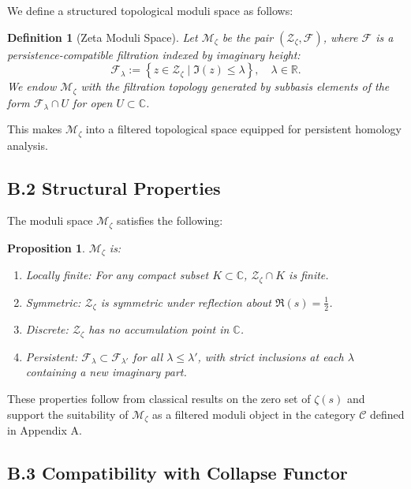 \documentclass[11pt]{article}
\newtheorem{definition}[theorem]{Definition}
\newtheorem{proposition}[theorem]{Proposition}
\begin{document}
We define a structured topological moduli space as follows:

\begin{definition}[Zeta Moduli Space]
Let $\mathcal{M}_\zeta$ be the pair $(\mathcal{Z}_\zeta, \mathcal{F})$, where $\mathcal{F}$ is a persistence-compatible filtration  
indexed by imaginary height:
\[
\mathcal{F}_\lambda := \left\{ z \in \mathcal{Z}_\zeta \mid \Im(z) \leq \lambda \right\}, \quad \lambda \in \mathbb{R}.
\]
We endow $\mathcal{M}_\zeta$ with the filtration topology generated by subbasis elements of the form $\mathcal{F}_\lambda \cap U$  
for open $U \subset \mathbb{C}$.
\end{definition}

This makes $\mathcal{M}_\zeta$ into a filtered topological space equipped for persistent homology analysis.

\subsection*{B.2 Structural Properties}

The moduli space $\mathcal{M}_\zeta$ satisfies the following:

\begin{proposition}
$\mathcal{M}_\zeta$ is:
\begin{enumerate}
    \item Locally finite: For any compact subset $K \subset \mathbb{C}$, $\mathcal{Z}_\zeta \cap K$ is finite.
    \item Symmetric: $\mathcal{Z}_\zeta$ is symmetric under reflection about $\Re(s) = \tfrac{1}{2}$.
    \item Discrete: $\mathcal{Z}_\zeta$ has no accumulation point in $\mathbb{C}$.
    \item Persistent: $\mathcal{F}_\lambda \subset \mathcal{F}_{\lambda'}$ for all $\lambda \leq \lambda'$,  
    with strict inclusions at each $\lambda$ containing a new imaginary part.
\end{enumerate}
\end{proposition}

These properties follow from classical results on the zero set of $\zeta(s)$ and support the suitability of $\mathcal{M}_\zeta$  
as a filtered moduli object in the category $\mathcal{C}$ defined in Appendix A.

\subsection*{B.3 Compatibility with Collapse Functor}
\end{document}
